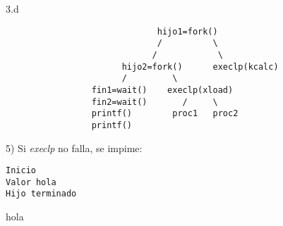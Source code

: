 \documentclass{article}
\begin{document}
3.d
\begin{verbatim}
                              hijo1=fork()
                              /          \
                             /            \
                       hijo2=fork()      execlp(kcalc)
                       /         \
                 fin1=wait()    execlp(xload)
                 fin2=wait()       /     \
                 printf()        proc1   proc2
                 printf()
\end{verbatim}

5) Si \emph{execlp} no falla, se impime:\\
\begin{verbatim}
Inicio
Valor hola
Hijo terminado
\end{verbatim}
hola
\end{document}
